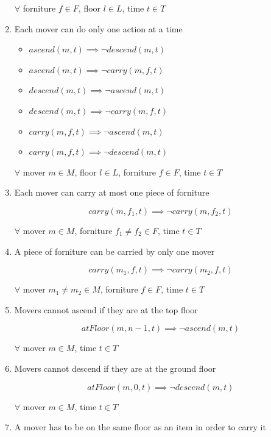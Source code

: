 \documentclass[a4paper, 11pt]{article}
\begin{document}
\begin{enumerate}
    $\forall$ forniture $f \in F$, floor $l \in L$, time $t \in T$

    \item Each mover can do only one action at a time

    \begin{itemize}
        \item $ascend(m, t) \implies \lnot descend(m, t)$
        \item $ascend(m, t) \implies \lnot carry(m, f, t)$
        \item $descend(m, t) \implies \lnot ascend(m, t)$
        \item $descend(m, t) \implies \lnot carry(m, f, t)$
        \item $carry(m, f, t) \implies \lnot ascend(m, t)$
        \item $carry(m, f, t) \implies \lnot descend(m, t)$
    \end{itemize}

    $\forall$ mover $m \in M$, floor $l \in L$, forniture $f \in F$, time $t \in T$

    \item Each mover can carry at most one piece of forniture

    $$ carry(m, f_1, t) \implies \lnot carry(m, f_2, t)$$

    $\forall$ mover $m\in M$, forniture $f_1 \neq f_2 \in F$, time $t \in T$

    \item A piece of forniture can be carried by only one mover

    $$ carry(m_1, f, t) \implies \lnot carry(m_2, f, t)$$

    $\forall$ mover $m_1 \neq m_2 \in M$, forniture $f\in F$, time $t \in T$

    \item Movers cannot ascend if they are at the top floor

    $$atFloor(m, n-1, t) \implies \lnot ascend(m, t)$$

    $\forall$ mover $m \in M$, time $t \in T$
    
    \item Movers cannot descend if they are at the ground floor

    $$atFloor(m, 0, t) \implies \lnot descend(m, t)$$

    $\forall$ mover $m \in M$, time $t \in T$

    \item A mover has to be on the same floor as an item in order to carry it


\end{enumerate}
\end{document}
